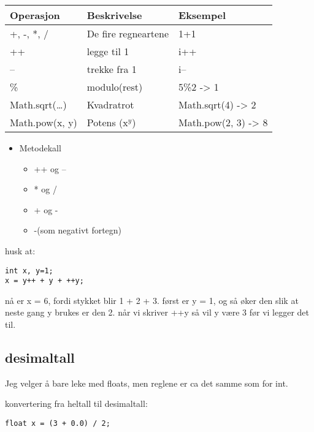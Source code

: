 \documentclass[a4paper,norsk,10pt]{article}
\begin{document}
\begin{center}
\begin{tabular}{lll}
\hline
 Operasjon            &  Beskrivelse          &  Eksempel             \\
\hline
 +, -, *, /           &  De fire regneartene  &  1+1                  \\
\hline
 ++                   &  legge til 1          &  i++                  \\
\hline
 --                   &  trekke fra 1         &  i--                  \\
\hline
 \%                   &  modulo(rest)         &  5\%2 -> 1            \\
\hline
 Math.sqrt(\ldots{})  &  Kvadratrot           &  Math.sqrt(4) -> 2    \\
\hline
 Math.pow(x, y)       &  Potens (x$^y$)       &  Math.pow(2, 3) -> 8  \\
\hline
\end{tabular}
\end{center}


  
   
\begin{itemize}
\item Metodekall

\begin{itemize}
\item ++ og --
\item * og /
\item + og -
\item -(som negativt fortegn)
\end{itemize}

\end{itemize}

   husk at:
\begin{verbatim}
int x, y=1;
x = y++ + y + ++y;
\end{verbatim}
   nå er x = 6, fordi stykket blir 1 + 2 + 3. først er y = 1, og 
   så øker den slik at neste gang y brukes er den 2. 
   når vi skriver ++y så vil y være 3 før vi legger det til.
\subsection{desimaltall}
\label{sec-1.2}


   Jeg velger å bare leke med floats, men reglene er ca det samme som for int.

   konvertering fra heltall til desimaltall:
\begin{verbatim}
float x = (3 + 0.0) / 2;
\end{verbatim}
\end{document}
